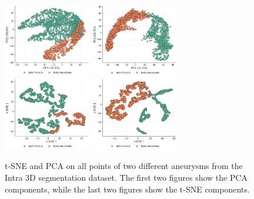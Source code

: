 \documentclass[%
 reprint,
 amsmath,amssymb,
 aps,
 floatfix,
 nofootinbib,
]{revtex4-2}
\begin{document}
\begin{figure}[h]
  \centering
  \includegraphics[width=0.34\textwidth]{pca_intra_features.png}
  \includegraphics[width=0.34\textwidth]{pca_intra_features_2.png}
  \includegraphics[width=0.34\textwidth]{t-sne_intra_features.png}
  \includegraphics[width=0.34\textwidth]{t-sne_intra_features_2.png}
  \caption{t-SNE and PCA on all points of two different aneurysms from the Intra 3D segmentation dataset. The first two figures show the PCA components, while the last two figures show the t-SNE components.}
  \label{fig:seg_all}
\end{figure}
\end{document}
